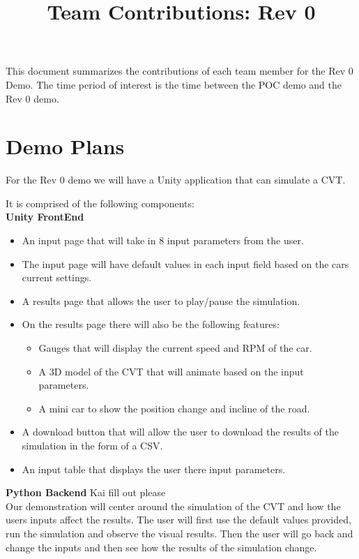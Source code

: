 \documentclass{article}
\title{Team Contributions: Rev 0\\\progname}
\author{\authname}
\date{}
\begin{document}
\maketitle

This document summarizes the contributions of each team member for the Rev 0
Demo.  The time period of interest is the time between the POC demo and the Rev
0 demo.

\section{Demo Plans}


For the Rev 0 demo we will have a Unity application that can simulate a CVT.

It is comprised of the following components:\\

\textbf{Unity FrontEnd}

\begin{itemize}
  \item An input page that will take in 8 input parameters from the user.
  \item The input page will have default values in each input field based on the cars current settings.
  \item A results page that allows the user to play/pause the simulation.
  \item On the results page there will also be the following features:
  \begin{itemize}
    \item Gauges that will display the current speed and RPM of the car.
    \item A 3D model of the CVT that will animate based on the input parameters.
    \item A mini car to show the position change and incline of the road.
  \end{itemize}
  \item A download button that will allow the user to download the results of the simulation in the form of a CSV.
  \item An input table that displays the user there input parameters.
\end{itemize}

\textbf{Python Backend}
Kai fill out please\\

Our demonstration will center around the simulation of the CVT and how the users inputs affect the results.
The user will first use the default values provided, run the simulation and observe the visual results.
Then the user will go back and change the inputs and then see how the results of the simulation change. 
\end{document}

